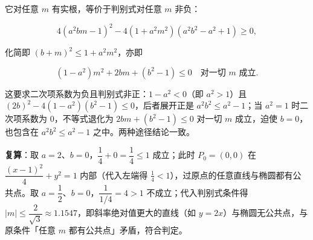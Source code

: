 \begin{answer}
它对任意 $m$ 有实根，等价于判别式对任意 $m$ 非负：

\nopagebreak[4]
\[
4\left(a^2bm-1\right)^2-4\left(1+a^2m^2\right)\left(a^2b^2-a^2+1\right)\geqslant0 ,
\]

化简即 $\left(b+m\right)^2\leqslant1+a^2m^2$，亦即

\nopagebreak[4]
\[
\left(1-a^2\right)m^2+2bm+\left(b^2-1\right)\leqslant0\quad\text{对一切 }m\text{ 成立}.
\]

这要求二次项系数为负且判别式非正：$1-a^2<0$（即 $a^2>1$）且 $(2b)^2-4(1-a^2)(b^2-1)\leqslant0$，后者展开正是 $a^2b^2\leqslant a^2-1$；当 $a^2=1$ 时二次项系数为 $0$，不等式退化为 $2bm+(b^2-1)\leqslant0$ 对一切 $m$ 成立，迫使 $b=0$，也包含在 $a^2b^2\leqslant a^2-1$ 之中。两种途径结论一致。

\textbf{复算}：取 $a=2$、$b=0$，$\dfrac1{4}+0=\dfrac14\leqslant1$ 成立；此时 $P_0=(0,0)$ 在 $\dfrac{(x-1)^2}{4}+y^2=1$ 内部（代入左端得 $\frac14<1$），过原点的任意直线与椭圆都有公共点。取 $a=\dfrac12$、$b=0$，$\dfrac1{1/4}=4>1$ 不成立；代入判别式条件得 $|m|\leqslant\dfrac{2}{\sqrt3}\approx1.1547$，即斜率绝对值更大的直线（如 $y=2x$）与椭圆无公共点，与原条件「任意 $m$ 都有公共点」矛盾，符合判定。


\end{answer}